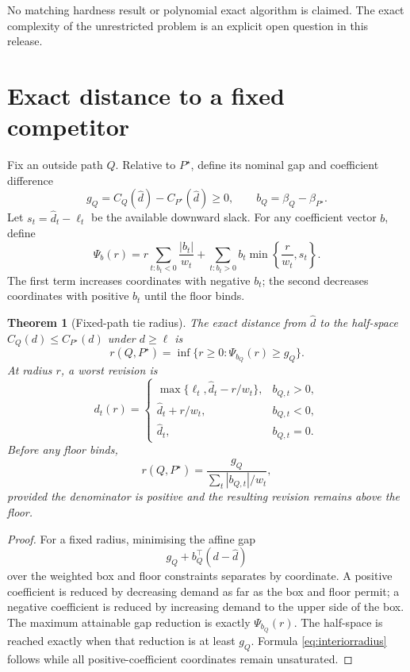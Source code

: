 \documentclass[11pt]{article}
\newtheorem{theorem}{Theorem}[section]
\theoremstyle{definition}
\newcommand{\dhat}{\widehat d}
\newcommand{\ellv}{\ell}
\begin{document}
No matching hardness result or polynomial exact algorithm is claimed. The exact complexity of the unrestricted problem is an explicit open question in this release.

\section{Exact distance to a fixed competitor}

Fix an outside path $Q$. Relative to $P^\star$, define its nominal gap and coefficient difference
\begin{equation}\label{eq:gapb}
g_Q=C_Q(\dhat)-C_{P^\star}(\dhat)\ge0,
\qquad
b_Q=\beta_Q-\beta_{P^\star}.
\end{equation}
Let $s_t=\dhat_t-\ellv_t$ be the available downward slack. For any coefficient vector $b$, define
\begin{equation}\label{eq:Psi}
\Psi_b(r)=
 r\sum_{t:b_t<0}\frac{|b_t|}{w_t}
 +\sum_{t:b_t>0}b_t\min\left\{\frac{r}{w_t},s_t\right\}.
\end{equation}
The first term increases coordinates with negative $b_t$; the second decreases coordinates with positive $b_t$ until the floor binds.

\begin{theorem}[Fixed-path tie radius]\label{thm:pairwise}
The exact distance from $\dhat$ to the half-space $C_Q(d)\le C_{P^\star}(d)$ under $d\ge\ellv$ is
\begin{equation}\label{eq:pairradius}
r(Q,P^\star)=\inf\{r\ge0:\Psi_{b_Q}(r)\ge g_Q\}.
\end{equation}
At radius $r$, a worst revision is
\begin{equation}\label{eq:worstrevision}
d_t(r)=
\begin{cases}
\max\{\ellv_t,\dhat_t-r/w_t\},&b_{Q,t}>0,\\
\dhat_t+r/w_t,&b_{Q,t}<0,\\
\dhat_t,&b_{Q,t}=0.
\end{cases}
\end{equation}
Before any floor binds,
\begin{equation}\label{eq:interiorradius}
r(Q,P^\star)=
\frac{g_Q}{\sum_t|b_{Q,t}|/w_t},
\end{equation}
provided the denominator is positive and the resulting revision remains above the floor.
\end{theorem}

\begin{proof}
For a fixed radius, minimising the affine gap
\[
g_Q+b_Q^\top(d-\dhat)
\]
over the weighted box and floor constraints separates by coordinate. A positive coefficient is reduced by decreasing demand as far as the box and floor permit; a negative coefficient is reduced by increasing demand to the upper side of the box. The maximum attainable gap reduction is exactly $\Psi_{b_Q}(r)$. The half-space is reached exactly when that reduction is at least $g_Q$. Formula \eqref{eq:interiorradius} follows while all positive-coefficient coordinates remain unsaturated.
\end{proof}
\end{document}

